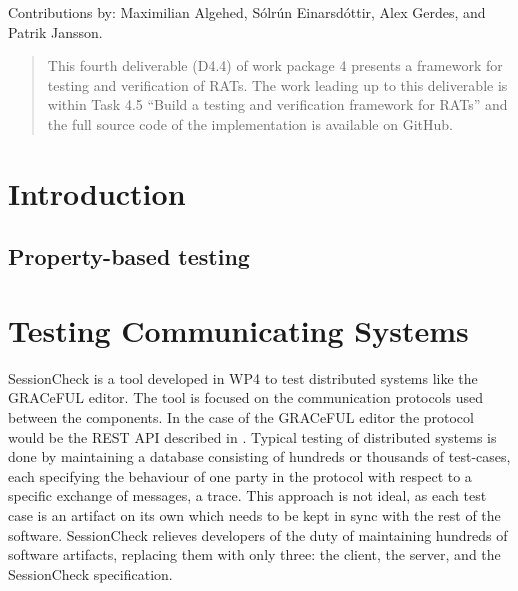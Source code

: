 \documentclass{article}
\begin{document}
Contributions by: Maximilian Algehed, Sólrún Einarsdóttir, Alex
Gerdes, and Patrik Jansson.

\begin{abstract}

This fourth deliverable (D4.4) of work package 4 presents a framework for
testing and verification of RATs.
%
The work leading up to this deliverable is within Task 4.5 ``Build a
testing and verification framework for RATs'' and the full source code
of the implementation is available on GitHub.


\end{abstract}

\vfill

\setcounter{tocdepth}{2}
\tableofcontents

\vfill


\newpage

\section{Introduction}



\subsection{Property-based testing}


\section{}

\section{Testing Communicating Systems}
%
SessionCheck \cite{SessionCheck} is a tool developed in WP4 to test distributed systems like
the GRACeFUL editor.
%
The tool is focused on the communication protocols used between the components.
%
In the case of the GRACeFUL editor the protocol would be the REST API described in \cite{D4.3}. 
%
Typical testing of distributed systems is done by maintaining a database consisting of hundreds
or thousands of test-cases, each specifying the behaviour of one party in the protocol with
respect to a specific exchange of messages, a trace.
%
This approach is not ideal, as each test case is an artifact on its own which needs to be kept
in sync with the rest of the software.
%
SessionCheck relieves developers of the duty of maintaining hundreds of software
artifacts, replacing them with only three: the client, the server, and the SessionCheck specification.
\end{document}
